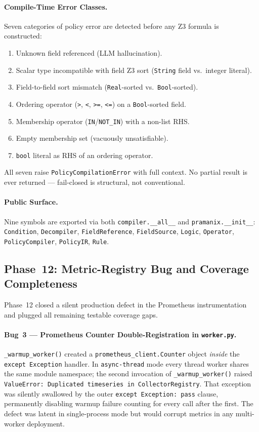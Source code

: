 \documentclass[12pt,a4paper,oneside]{report}
\newcommand{\code}[1]{\texttt{#1}}           %
\begin{document}
\paragraph{Compile-Time Error Classes.}
Seven categories of policy error are detected before any Z3 formula is
constructed:
\begin{enumerate}
\item Unknown field referenced (LLM hallucination).
\item Scalar type incompatible with field Z3 sort (\code{String} field vs.\
  integer literal).
\item Field-to-field sort mismatch (\code{Real}-sorted vs.\ \code{Bool}-sorted).
\item Ordering operator (\code{>}, \code{<}, \code{>=}, \code{<=}) on a
  \code{Bool}-sorted field.
\item Membership operator (\code{IN}/\code{NOT\_IN}) with a non-list RHS.
\item Empty membership set (vacuously unsatisfiable).
\item \code{bool} literal as RHS of an ordering operator.
\end{enumerate}
All seven raise \code{PolicyCompilationError} with full context.  No partial
result is ever returned --- fail-closed is structural, not conventional.

\paragraph{Public Surface.}
Nine symbols are exported via both \code{compiler.\_\_all\_\_} and
\code{pramanix.\_\_init\_\_}:
\code{Condition}, \code{Decompiler}, \code{FieldReference},
\code{FieldSource}, \code{Logic}, \code{Operator}, \code{PolicyCompiler},
\code{PolicyIR}, \code{Rule}.

\subsection*{Phase~12: Metric-Registry Bug and Coverage Completeness}

Phase~12 closed a silent production defect in the Prometheus instrumentation
and plugged all remaining testable coverage gaps.

\paragraph{Bug~3 --- Prometheus Counter Double-Registration in
  \code{worker.py}.}
\code{\_warmup\_worker()} created a \code{prometheus\_client.Counter} object
\emph{inside} the \code{except~Exception} handler.  In \code{async-thread}
mode every thread worker shares the same module namespace; the second
invocation of \code{\_warmup\_worker()} raised \code{ValueError: Duplicated
timeseries in CollectorRegistry}.  That exception was silently swallowed by
the outer \code{except~Exception:~pass} clause, permanently disabling warmup
failure counting for every call after the first.  The defect was latent in
single-process mode but would corrupt metrics in any multi-worker deployment.
\end{document}
